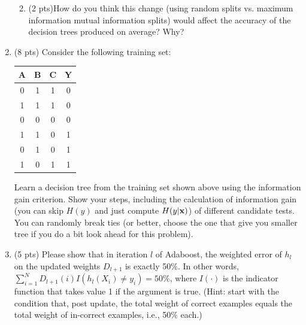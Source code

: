 \documentclass{article}
\def\x{{\bf x}}
\begin{document}
\begin{enumerate}
\begin{enumerate}

\item (2 pts)How do you think this change (using random splits vs. maximum information mutual information splits) would affect the accuracy of the decision trees produced on average?  Why?


\end{enumerate}
\item (8 pts) Consider the following training set:

\begin{center}
\begin{tabular}{|c|c|c|c|}\hline
A&B&C&Y\\ \hline
0&1&1&0 \\ \hline
1&1&1&0 \\ \hline
0&0&0&0 \\ \hline
1&1&0&1 \\ \hline
0&1&0&1 \\ \hline
1&0&1&1 \\ \hline
\end{tabular}
\end{center}

Learn a decision tree from the training set shown above using the information gain criterion. Show your steps, including the calculation of information gain (you can skip $H(y)$ and just compute $H(y|\x)$) of different candidate tests. You can randomly break ties (or better, choose the one that give you smaller tree if you do a bit look ahead for this problem).


\item (5 pts) Please show that in iteration $l$ of Adaboost, the weighted error of $h_l$ on the updated weights $D_{l+1}$ is exactly 50\%. In other words, $\sum_{i=1}^N D_{l+1}(i) I(h_l(X_i)\neq y_i) = 50\%$, where $I(\cdot)$ is the indicator function that takes value 1 if the argument is true. (Hint: start with the condition that, post update, the total weight of correct examples equals the total weight of in-correct examples, i.e., 50\% each.)


\end{enumerate}
\end{document}
